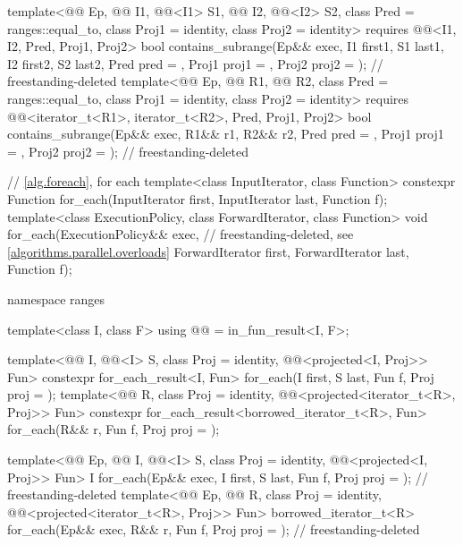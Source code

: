 \begin{codeblock}
{{    template<@@ Ep, @@ I1, @@<I1> S1,
             @@ I2, @@<I2> S2,
             class Pred = ranges::equal_to, class Proj1 = identity, class Proj2 = identity>
      requires @@<I1, I2, Pred, Proj1, Proj2>
      bool contains_subrange(Ep&& exec, I1 first1, S1 last1, I2 first2, S2 last2, Pred pred = {},
                             Proj1 proj1 = {}, Proj2 proj2 = {});           // freestanding-deleted
    template<@@ Ep, @@ R1, @@ R2,
             class Pred = ranges::equal_to, class Proj1 = identity, class Proj2 = identity>
      requires @@<iterator_t<R1>, iterator_t<R2>, Pred, Proj1, Proj2>
      bool contains_subrange(Ep&& exec, R1&& r1, R2&& r2, Pred pred = {}, Proj1 proj1 = {},
                             Proj2 proj2 = {});                             // freestanding-deleted
  }

  // \ref{alg.foreach}, for each
  template<class InputIterator, class Function>
    constexpr Function for_each(InputIterator first, InputIterator last, Function f);
  template<class ExecutionPolicy, class ForwardIterator, class Function>
    void for_each(ExecutionPolicy&& exec,                       // freestanding-deleted, see \ref{algorithms.parallel.overloads}
                  ForwardIterator first, ForwardIterator last, Function f);

  namespace ranges {
    template<class I, class F>
      using @@ = in_fun_result<I, F>;

    template<@@ I, @@<I> S, class Proj = identity,
             @@<projected<I, Proj>> Fun>
      constexpr for_each_result<I, Fun>
        for_each(I first, S last, Fun f, Proj proj = {});
    template<@@ R, class Proj = identity,
             @@<projected<iterator_t<R>, Proj>> Fun>
      constexpr for_each_result<borrowed_iterator_t<R>, Fun>
        for_each(R&& r, Fun f, Proj proj = {});

    template<@@ Ep, @@ I, @@<I> S,
             class Proj = identity,
             @@<projected<I, Proj>> Fun>
      I for_each(Ep&& exec, I first, S last, Fun f, Proj proj = {});        // freestanding-deleted
    template<@@ Ep, @@ R, class Proj = identity,
             @@<projected<iterator_t<R>, Proj>> Fun>
      borrowed_iterator_t<R>
        for_each(Ep&& exec, R&& r, Fun f, Proj proj = {});                  // freestanding-deleted
  }

}
\end{codeblock}
